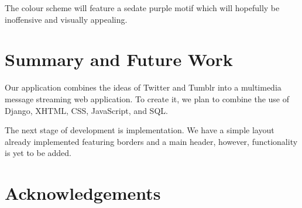 \documentclass{sig-alt-release2}
\begin{document}
The colour scheme will feature a sedate purple motif which will hopefully be inoffensive and visually appealing.

\section{Summary and Future Work}

Our application combines the ideas of Twitter and Tumblr into a multimedia message streaming web application. To create it, we plan to combine the use of Django, XHTML, CSS, JavaScript, and SQL.

The next stage of development is implementation. We have a simple layout already implemented featuring borders and a main header, however, functionality is yet to be added.

\section{Acknowledgements}




\end{document}
